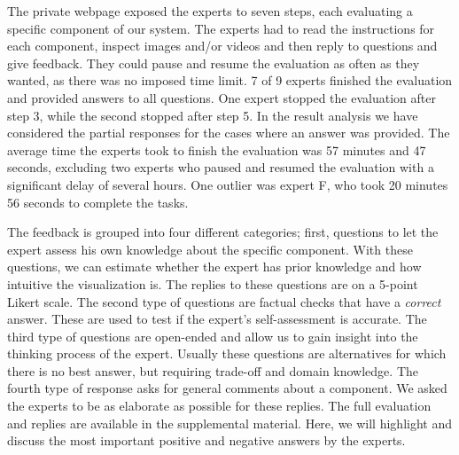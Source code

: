 \documentclass[review,journal]{vgtc}         %
\begin{document}
The private webpage exposed the experts to seven steps, each evaluating a specific component of our system. The experts had to read the instructions for each component, inspect images and/or videos and then reply to questions and give feedback. They could pause and resume the evaluation as often as they wanted, as there was no imposed time limit. 7 of 9 experts finished the evaluation and provided answers to all questions. One expert stopped the evaluation after step 3, while the second stopped after step 5. In the result analysis we have considered the partial responses for the cases where an answer was provided. The average time the experts took to finish the evaluation was 57 minutes and 47 seconds, excluding two experts who paused and resumed the evaluation with a significant delay of several hours. One outlier was expert F, who took 20 minutes 56 seconds to complete the tasks.

The feedback is grouped into four different categories; first, questions to let the expert assess his own knowledge about the specific  component. With these questions, we can estimate whether the expert has prior knowledge and how intuitive the visualization is. The replies to these questions are on a 5-point Likert scale. The second type of questions are factual checks that have a \emph{correct} answer. These are used to test if the expert's self-assessment is accurate. The third type of questions are open-ended and allow us to gain insight into the thinking process of the expert. Usually these questions are alternatives for which there is no best answer, but requiring trade-off and domain knowledge. The fourth type of response asks for general comments about a component. We asked the experts to be as elaborate as possible for these replies. The full evaluation and replies are available in the supplemental material. Here, we will highlight and discuss the most important positive and negative answers by the experts. 
\end{document}
